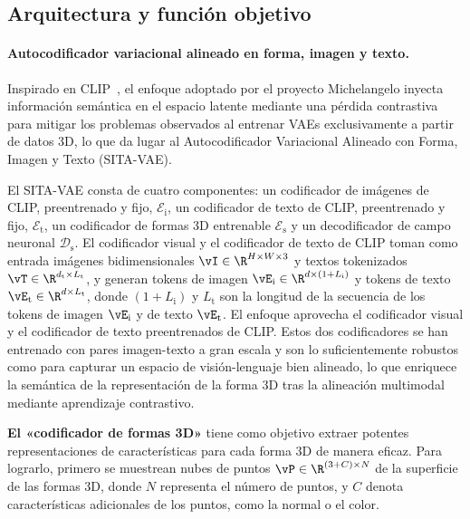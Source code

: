 \documentclass[../../book-main_es.tex]{subfiles}
\begin{document}
\subsection{Arquitectura y función objetivo}

\paragraph{Autocodificador variacional alineado en forma, imagen y texto.}

Inspirado en CLIP~\cite{pmlr-v139-radford21a}, el enfoque adoptado por
el proyecto Michelangelo inyecta información semántica en el espacio latente
mediante una pérdida contrastiva para mitigar los problemas observados al
entrenar VAEs exclusivamente a partir de datos 3D, lo que da lugar al Autocodificador 
Variacional Alineado con Forma, Imagen y Texto (SITA-VAE).

El SITA-VAE consta de cuatro componentes: un codificador de imágenes de CLIP, preentrenado y fijo,
$\mathcal{E}_{\mathrm{i}}$, un codificador de texto de CLIP, preentrenado y fijo,
$\mathcal{E}_{\mathrm{t}}$, un codificador de formas 3D entrenable
$\mathcal{E}_{\mathrm{s}}$ y un decodificador de campo neuronal $\mathcal{D}_{\mathrm{s}}$.
El codificador visual y el codificador de texto de CLIP toman como entrada imágenes bidimensionales $\vI \in \R^{H \times
W \times 3}$ y textos tokenizados $\vT \in \R^{d_{{\mathrm{t}}} \times
L_{\mathrm{t}}}$, y generan tokens de imagen
$\vE_{\mathrm{i}} \in \R^{d \times (1 + L_{\mathrm{i}})}$ y tokens de texto
$\vE_{\mathrm{t}} \in \R^{d \times L_{\mathrm{t}}}$, donde
$(1+L_{\mathrm{i}})$ y $L_{\mathrm{t}}$ son la longitud de la secuencia de
los tokens de imagen $\vE_{\mathrm{i}}$ y de texto $\vE_{\mathrm{t}}$.
El enfoque aprovecha el codificador visual y
el codificador de texto preentrenados de CLIP. Estos dos codificadores se han entrenado con pares imagen-texto a gran escala
y son lo suficientemente robustos como para capturar un espacio de visión-lenguaje bien alineado,
lo que enriquece la semántica de la representación de la forma 3D
tras la alineación multimodal mediante aprendizaje contrastivo.

\textbf{El «codificador de formas 3D»} tiene como objetivo extraer potentes representaciones de características 
para cada forma 3D de manera eficaz. Para lograrlo,
primero se muestrean nubes de puntos $\vP \in \R^{(3 + C) \times N}$
de la superficie de las formas 3D, donde $N$ representa el número de
puntos, y $C$ denota características adicionales de los puntos, como la normal o
el color.
\end{document}
